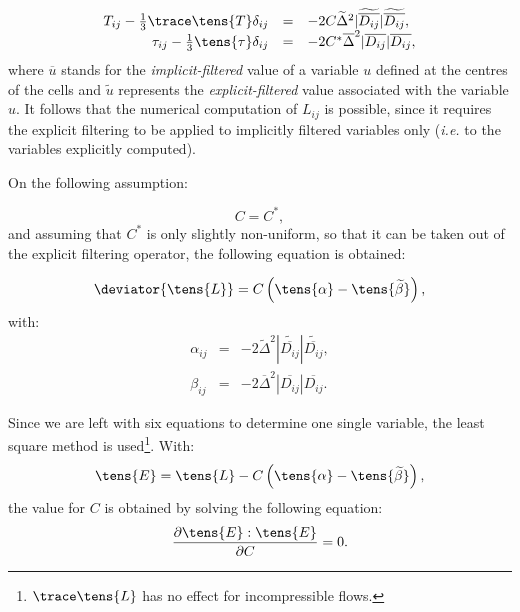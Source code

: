 \begin{equation}
\begin{array}{ r c l}
T_{ij}-\frac{1}{3}\trace \tens{T} \delta_{ij} &=& -2 C \widetilde{\Delta}^2 |\widetilde{%
\overline{D_{ij}}}| \widetilde{\overline{D_{ij}}}, \\
\tau_{ij}-\frac{1}{3} \tens{\tau } \delta_{ij} &=& -2 C^* \overline{\Delta}^2 |%
\overline{D_{ij}}| \overline{D_{ij}} ,
\end{array}
\end{equation}
where
$\overline{u}$ stands for the \emph{implicit-filtered} value of a variable $u$
defined at the centres of the cells and $\tilde{u}$ represents the
\emph{explicit-filtered} value associated with the variable $u$. It follows that
the numerical computation of $L_{ij}$ is possible, since it requires the
explicit filtering to be applied to implicitly filtered variables only
(\emph{i.e.} to the variables explicitly computed).

On the following assumption:

\begin{equation}
C = C^*,
\end{equation}
and assuming that $C^*$ is only slightly non-uniform, so that it can be
taken out of the explicit filtering operator, the following equation is
obtained:

\begin{equation}
\deviator{\tens{L}} =  C \left(
\tens{ \alpha}- \tens{\widetilde{\beta}} \right),
\end{equation}
with:
\begin{equation}
\begin{array}{rcl}
\alpha_{ij} &=& -2 \widetilde{\Delta}^2 |\widetilde{\overline{D_{ij}}}|
\widetilde{\overline{D_{ij}}} , \\
\beta_{ij} &=& -2 \overline{\Delta}^2 |\overline{D_{ij}}| \overline{D_{ij}}.
\end{array}
\end{equation}

Since we are left with six equations to determine one single variable, the
least square method is used\footnote{
$\trace \tens{L}$ has no effect for
incompressible flows.}. With:
\begin{equation}
\tens{E} = \tens{L}-C \left( \tens{\alpha} - \tens{\widetilde{\beta}} \right),
\end{equation}
the value for $C$ is obtained by solving the following equation:
\begin{equation}
\frac{\partial \tens{E} : \tens{E}}{\partial C} = 0.
\end{equation}

